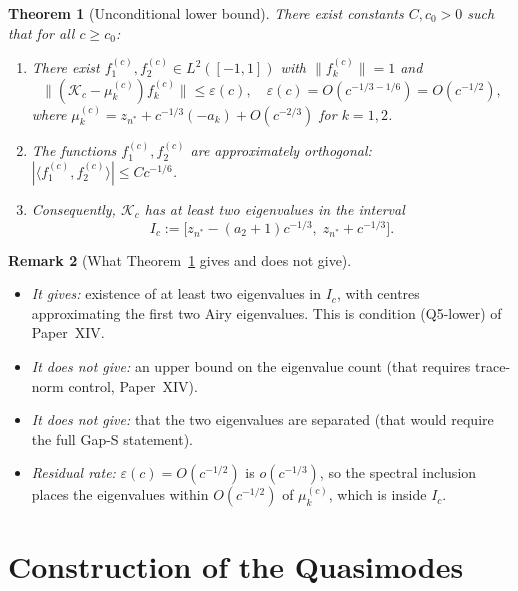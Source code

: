 \documentclass[12pt,a4paper]{amsart}
\newtheorem{theorem}{Theorem}[section]
\theoremstyle{definition}
\newtheorem{remark}[theorem]{Remark}
\newcommand{\Kc}{\mathcal{K}_c}
\newcommand{\norm}[1]{\|#1\|}
\begin{document}
\begin{theorem}[Unconditional lower bound]\label{thm:main}
There exist constants $C, c_0 > 0$ such that for all $c \geq c_0$:
\begin{enumerate}[nosep,label=(\roman*)]
  \item There exist $f_1^{(c)}, f_2^{(c)} \in L^2([-1,1])$
    with $\norm{f_k^{(c)}} = 1$ and
    \begin{equation}\label{eq:residual}
      \norm{(\Kc - \mu_k^{(c)}) f_k^{(c)}} \leq \varepsilon(c),
      \quad \varepsilon(c) = O(c^{-1/3-1/6}) = O(c^{-1/2}),
    \end{equation}
    where $\mu_k^{(c)} = z_{n^*} + c^{-1/3}(-a_k) + O(c^{-2/3})$
    for $k=1,2$.
  \item The functions $f_1^{(c)}, f_2^{(c)}$ are approximately
    orthogonal:
    $|\langle f_1^{(c)}, f_2^{(c)}\rangle| \leq C c^{-1/6}$.
  \item Consequently, $\Kc$ has at least two eigenvalues in the interval
    \begin{equation}\label{eq:window}
      I_c := \bigl[z_{n^*} - (a_2 + 1)c^{-1/3},\;
               z_{n^*} + c^{-1/3}\bigr].
    \end{equation}
\end{enumerate}
\end{theorem}

\begin{remark}[What Theorem~\ref{thm:main} gives and does not give]
\leavevmode
\begin{itemize}[nosep]
  \item \emph{It gives:} existence of at least two eigenvalues in
    $I_c$, with centres approximating the first two Airy eigenvalues.
    This is condition (Q5-lower) of Paper~XIV.
  \item \emph{It does not give:} an upper bound on the eigenvalue count
    (that requires trace-norm control, Paper~XIV).
  \item \emph{It does not give:} that the two eigenvalues are separated
    (that would require the full Gap-S statement).
  \item \emph{Residual rate:} $\varepsilon(c) = O(c^{-1/2})$ is
    $o(c^{-1/3})$, so the spectral inclusion places the eigenvalues
    within $O(c^{-1/2})$ of $\mu_k^{(c)}$, which is inside $I_c$.
\end{itemize}
\end{remark}

\section{Construction of the Quasimodes}
\label{sec:construction}
\end{document}
